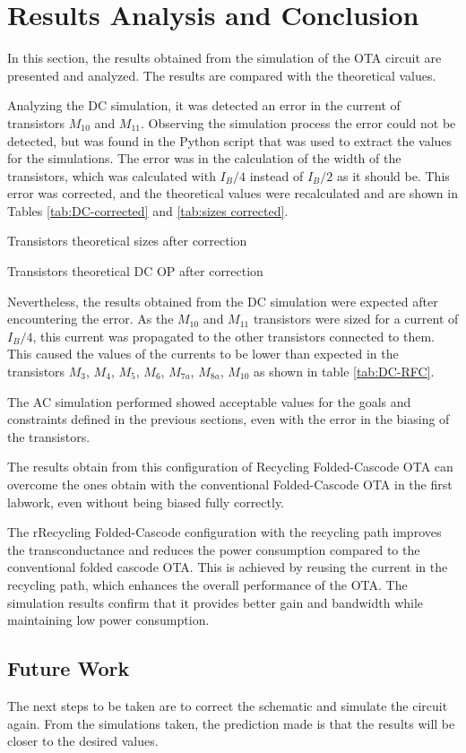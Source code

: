 \section{Results Analysis and Conclusion}

In this section, the results obtained from the simulation of the OTA circuit are presented and analyzed. The results are compared with the theoretical values.

Analyzing the DC simulation, it was detected an error in the current of transistors $M_{10}$ and $M_{11}$. Observing the simulation process the error could not be detected, but was found in the Python script that was used to extract the values for the simulations. The error was in the calculation of the width of the transistors, which was calculated with $I_B/4$ instead of $I_B/2$ as it should be. This error was corrected, and the theoretical values were recalculated and are shown in Tables \ref{tab:DC-corrected} and \ref{tab:sizes corrected}.

\begin{table}[H]
    \centering
    \caption{Transistors theoretical sizes after correction}
    \label{tab:sizes corrected}
\end{table}

\begin{table}[H]
    \centering
    \caption{Transistors theoretical DC OP after correction}
    \label{tab:DC-corrected}
\end{table}

Nevertheless, the results obtained from the DC simulation were expected after encountering the error. As the $M_{10}$ and $M_{11}$ transistors were sized for a current of $I_B/4$, this current was propagated to the other transistors connected to them. This caused the values of the currents to be lower than expected in the transistors $M_3$, $M_4$, $M_5$, $M_6$, $M_{7a}$, $M_{8a}$, $M_{10}$ as shown in table \ref{tab:DC-RFC}.

The AC simulation performed showed acceptable values for the goals and constraints defined in the previous sections, even with the error in the biasing of the transistors.

The results obtain from this configuration of Recycling Folded-Cascode OTA can overcome the ones obtain with the conventional Folded-Cascode OTA in the first labwork, even without being biased fully correctly.

The rRecycling Folded-Cascode configuration with the recycling path improves the transconductance and reduces the power consumption compared to the conventional folded cascode OTA. This is achieved by reusing the current in the recycling path, which enhances the overall performance of the OTA. The simulation results confirm that it provides better gain and bandwidth while maintaining low power consumption.

\subsection{Future Work}

The next steps to be taken are to correct the schematic and simulate the circuit again. From the simulations taken, the prediction made is that the results will be closer to the desired values. 